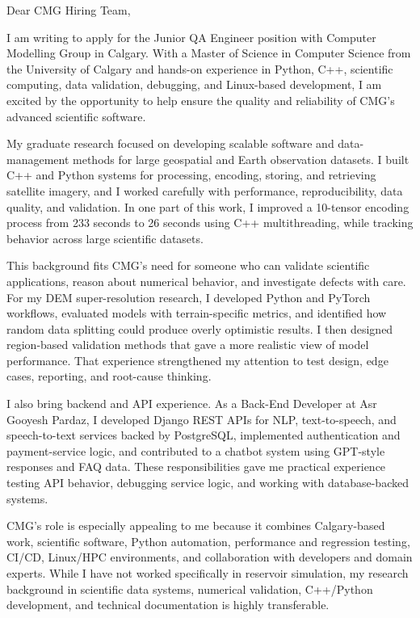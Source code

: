 \documentclass[11pt]{letter}
\begin{document}
\begin{letter}{}

\opening{Dear CMG Hiring Team,}

I am writing to apply for the Junior QA Engineer position with Computer Modelling Group in Calgary. With a Master of Science in Computer Science from the University of Calgary and hands-on experience in Python, C++, scientific computing, data validation, debugging, and Linux-based development, I am excited by the opportunity to help ensure the quality and reliability of CMG's advanced scientific software.

My graduate research focused on developing scalable software and data-management methods for large geospatial and Earth observation datasets. I built C++ and Python systems for processing, encoding, storing, and retrieving satellite imagery, and I worked carefully with performance, reproducibility, data quality, and validation. In one part of this work, I improved a 10-tensor encoding process from 233 seconds to 26 seconds using C++ multithreading, while tracking behavior across large scientific datasets.

This background fits CMG's need for someone who can validate scientific applications, reason about numerical behavior, and investigate defects with care. For my DEM super-resolution research, I developed Python and PyTorch workflows, evaluated models with terrain-specific metrics, and identified how random data splitting could produce overly optimistic results. I then designed region-based validation methods that gave a more realistic view of model performance. That experience strengthened my attention to test design, edge cases, reporting, and root-cause thinking.

I also bring backend and API experience. As a Back-End Developer at Asr Gooyesh Pardaz, I developed Django REST APIs for NLP, text-to-speech, and speech-to-text services backed by PostgreSQL, implemented authentication and payment-service logic, and contributed to a chatbot system using GPT-style responses and FAQ data. These responsibilities gave me practical experience testing API behavior, debugging service logic, and working with database-backed systems.

CMG's role is especially appealing to me because it combines Calgary-based work, scientific software, Python automation, performance and regression testing, CI/CD, Linux/HPC environments, and collaboration with developers and domain experts. While I have not worked specifically in reservoir simulation, my research background in scientific data systems, numerical validation, C++/Python development, and technical documentation is highly transferable.


\end{letter}
\end{document}
